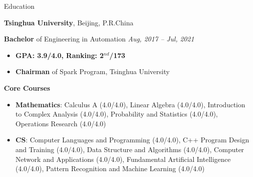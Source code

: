 \documentclass{resume} %
\begin{document}

\begin{rSection}{Education}

{\textbf{Tsinghua University}}, {Beijing, P.R.China}

\textbf{Bachelor} of Engineering in Automation \hfill {\em Aug, 2017 -- Jul, 2021}
\begin{itemize}
    \item \textbf{GPA: 3.9/4.0, Ranking: 2$^{nd}$/173}
    \item \textbf{Chairman} of Spark Program, Tsinghua University
\end{itemize}

\textbf{Core Courses}
\begin{spacing}{1.05}
\begin{itemize}
    \item \textbf{Mathematics}: Calculus A (4.0/4.0), 
    Linear Algebra (4.0/4.0), 
    Introduction to Complex Analysis (4.0/4.0), 
    Probability and Statistics (4.0/4.0), 
    Operations Research (4.0/4.0)
    \item \textbf{CS}: Computer Languages and Programming (4.0/4.0), 
    C++ Program Design and Training (4.0/4.0), 
    Data Structure and Algorithms (4.0/4.0), 
    Computer Network and Applications (4.0/4.0), 
    Fundamental Artificial Intelligence (4.0/4.0), 
    Pattern Recognition and Machine Learning (4.0/4.0)
\end{itemize}
\end{spacing}

\end{rSection}

\vspace{-0.3cm}
\end{document}
